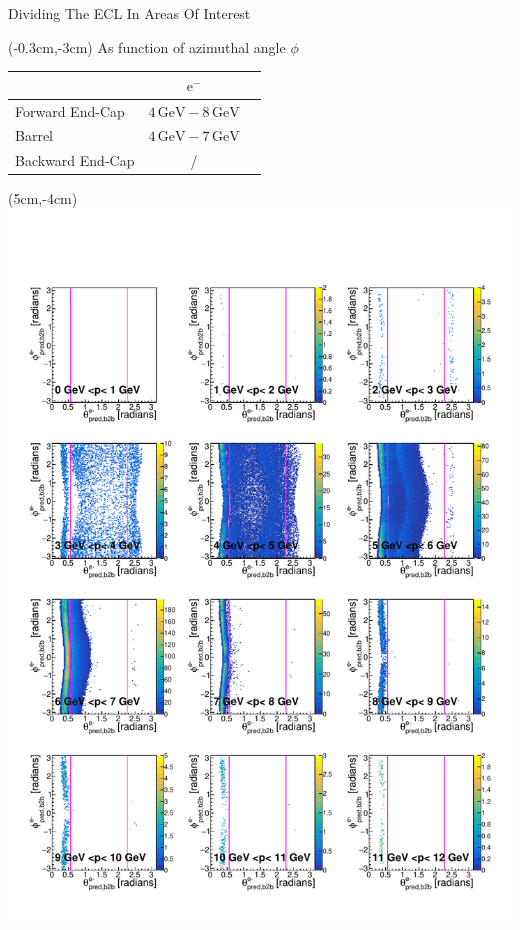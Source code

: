 \documentclass[8pt]{beamer}
\begin{document}
\begin{frame}{Dividing The ECL In Areas Of Interest}
	\begin{textblock*}{5cm}(-0.3cm,-3cm)
		As function of azimuthal angle $\phi$
	\begin{table}[h!]
		\centering
		\begin{tabular}{lcc}
			&$\textrm{e}^-$&\\
			\hline
			Forward End-Cap &$4\,\textrm{GeV} - 8\,\textrm{GeV}$&\\
			Barrel &$4\,\textrm{GeV} - 7\,\textrm{GeV}$&\\
			Backward End-Cap & /&\\	
		\end{tabular}

	\end{table}
	
	
\end{textblock*}
	
	
	\begin{textblock*}{6.5cm}(5cm,-4cm)
		\includegraphics[width=\textwidth]{VBilder/RTPMemD_MC}
	\end{textblock*}
	

\end{frame}
\end{document}
